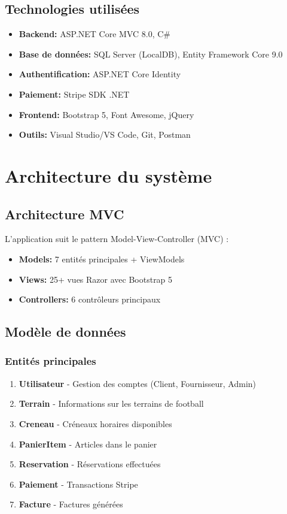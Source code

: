 \documentclass[12pt,a4paper]{article}
\begin{document}
\subsection{Technologies utilisées}
\begin{itemize}
    \item \textbf{Backend:} ASP.NET Core MVC 8.0, C\#
    \item \textbf{Base de données:} SQL Server (LocalDB), Entity Framework Core 9.0
    \item \textbf{Authentification:} ASP.NET Core Identity
    \item \textbf{Paiement:} Stripe SDK .NET
    \item \textbf{Frontend:} Bootstrap 5, Font Awesome, jQuery
    \item \textbf{Outils:} Visual Studio/VS Code, Git, Postman
\end{itemize}

\section{Architecture du système}

\subsection{Architecture MVC}
L'application suit le pattern Model-View-Controller (MVC) :
\begin{itemize}
    \item \textbf{Models:} 7 entités principales + ViewModels
    \item \textbf{Views:} 25+ vues Razor avec Bootstrap 5
    \item \textbf{Controllers:} 6 contrôleurs principaux
\end{itemize}

\subsection{Modèle de données}

\subsubsection{Entités principales}
\begin{enumerate}
    \item \textbf{Utilisateur} - Gestion des comptes (Client, Fournisseur, Admin)
    \item \textbf{Terrain} - Informations sur les terrains de football
    \item \textbf{Creneau} - Créneaux horaires disponibles
    \item \textbf{PanierItem} - Articles dans le panier
    \item \textbf{Reservation} - Réservations effectuées
    \item \textbf{Paiement} - Transactions Stripe
    \item \textbf{Facture} - Factures générées
\end{enumerate}
\end{document}
